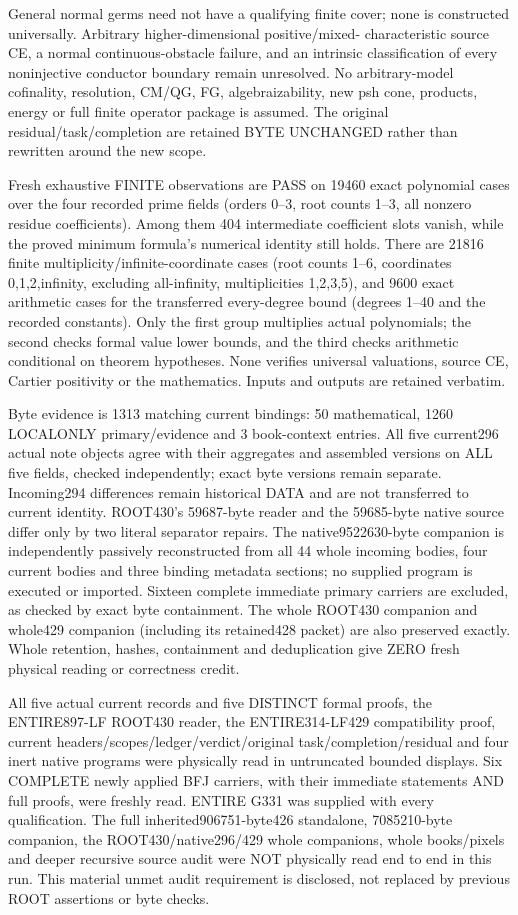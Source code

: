 \documentclass[11pt]{article}
\begin{document}
General normal germs need not have a qualifying finite cover; none is
constructed universally. Arbitrary higher-dimensional positive/mixed-
characteristic source CE, a normal continuous-obstacle failure, and an
intrinsic classification of every noninjective conductor boundary remain
unresolved. No arbitrary-model cofinality, resolution, CM/QG, FG,
algebraizability, new psh cone, products, energy or full finite operator
package is assumed. The original residual/task/completion are retained
BYTE UNCHANGED rather than rewritten around the new scope.

Fresh exhaustive FINITE observations are PASS on 19460 exact polynomial
cases over the four recorded prime fields (orders 0--3, root counts 1--3,
all nonzero residue coefficients). Among them 404 intermediate coefficient
slots vanish, while the proved minimum formula's numerical identity still
holds. There are 21816 finite multiplicity/infinite-coordinate cases
(root counts 1--6, coordinates 0,1,2,infinity, excluding all-infinity,
multiplicities 1,2,3,5), and 9600 exact arithmetic cases for the transferred
every-degree bound (degrees 1--40 and the recorded constants). Only the
first group multiplies actual polynomials; the second checks formal value
lower bounds, and the third checks arithmetic conditional on theorem
hypotheses. None verifies universal valuations, source CE, Cartier
positivity or the mathematics. Inputs and outputs are retained verbatim.

Byte evidence is 1313 matching current bindings: 50 mathematical,
1260 LOCALONLY primary/evidence and 3 book-context entries. All five
current296 actual note objects agree with their aggregates and assembled
versions on ALL five fields, checked independently; exact byte versions
remain separate. Incoming294 differences remain historical DATA and are
not transferred to current identity. ROOT430's 59687-byte reader and
the 59685-byte native source differ only by two literal separator repairs.
The native9522630-byte companion is independently passively reconstructed
from all 44 whole incoming bodies, four current bodies and three binding
metadata sections; no supplied program is executed or imported. Sixteen
complete immediate primary carriers are excluded, as checked by exact
byte containment. The whole ROOT430 companion and whole429 companion
(including its retained428 packet) are also preserved exactly. Whole
retention, hashes, containment and deduplication give ZERO fresh physical
reading or correctness credit.

All five actual current records and five DISTINCT formal proofs, the
ENTIRE897-LF ROOT430 reader, the ENTIRE314-LF429 compatibility proof,
current headers/scopes/ledger/verdict/original task/completion/residual and
four inert native programs were physically read in untruncated bounded
displays. Six COMPLETE newly applied BFJ carriers, with their immediate
statements AND full proofs, were freshly read. ENTIRE G331 was supplied
with every qualification. The full inherited906751-byte426 standalone,
7085210-byte companion, the ROOT430/native296/429 whole companions,
whole books/pixels and deeper recursive source audit were NOT physically
read end to end in this run. This material unmet audit requirement is
disclosed, not replaced by previous ROOT assertions or byte checks.
\end{document}
